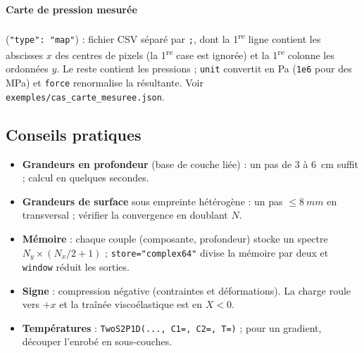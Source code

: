 \documentclass[11pt,a4paper]{article}
\begin{document}
\paragraph{Carte de pression mesurée} (\texttt{"type": "map"}) : fichier CSV séparé par
\texttt{;}, dont la 1\textsuperscript{re} ligne contient les abscisses $x$ des centres de pixels
(la 1\textsuperscript{re} case est ignorée) et la 1\textsuperscript{re} colonne les ordonnées $y$.
Le reste contient les pressions ; \texttt{unit} convertit en Pa (\texttt{1e6} pour des MPa) et
\texttt{force} renormalise la résultante. Voir \texttt{exemples/cas\_carte\_mesuree.json}.

\subsection{Conseils pratiques}
\begin{itemize}[nosep]
\item \textbf{Grandeurs en profondeur} (base de couche liée) : un pas de 3 à \SI{6}{cm} suffit ;
      calcul en quelques secondes.
\item \textbf{Grandeurs de surface} sous empreinte hétérogène : un pas $\le\SI{8}{mm}$ en
      transversal ; vérifier la convergence en doublant $N$.
\item \textbf{Mémoire} : chaque couple (composante, profondeur) stocke un spectre
      $N_y\times(N_x/2+1)$ ; \texttt{store="complex64"} divise la mémoire par deux et
      \texttt{window} réduit les sorties.
\item \textbf{Signe} : compression négative (contraintes et déformations). La charge roule vers
      $+x$ et la traînée viscoélastique est en $X<0$.
\item \textbf{Températures} : \texttt{TwoS2P1D(..., C1=, C2=, T=)} ; pour un gradient,
      découper l'enrobé en sous-couches.
\end{itemize}

\end{document}
